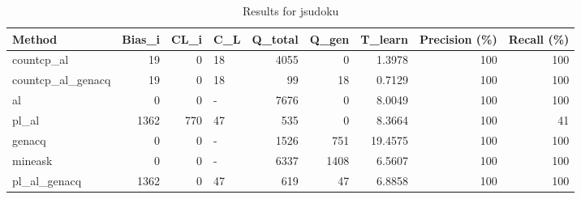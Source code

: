 \begin{table}[ht]
\caption{Results for jsudoku}
\begin{tabular}{lrrlrrrrr}
\hline
 Method            &   Bias\_i &   CL\_i & C\_L   &   Q\_total &   Q\_gen &   T\_learn &   Precision (\%) &   Recall (\%) \\
\hline
 countcp\_al        &       19 &      0 & 18    &      4055 &       0 &    1.3978 &             100 &          100 \\
 countcp\_al\_genacq &       19 &      0 & 18    &        99 &      18 &    0.7129 &             100 &          100 \\
 al                &        0 &      0 & -     &      7676 &       0 &    8.0049 &             100 &          100 \\
 pl\_al             &     1362 &    770 & 47    &       535 &       0 &    8.3664 &             100 &           41 \\
 genacq            &        0 &      0 & -     &      1526 &     751 &   19.4575 &             100 &          100 \\
 mineask           &        0 &      0 & -     &      6337 &    1408 &    6.5607 &             100 &          100 \\
 pl\_al\_genacq      &     1362 &      0 & 47    &       619 &      47 &    6.8858 &             100 &          100 \\
\hline
\end{tabular}
\end{table}